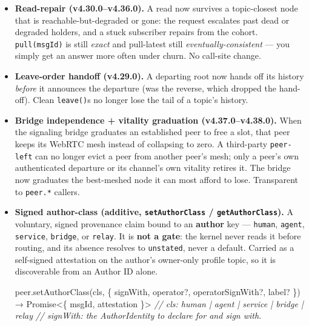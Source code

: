 \documentclass[
  nobib]{tufte-handout}
\newenvironment{Shaded}{}{}
\newcommand{\BuiltInTok}[1]{\textcolor[rgb]{0.00,0.50,0.00}{#1}}
\newcommand{\CommentTok}[1]{\textcolor[rgb]{0.38,0.63,0.69}{\textit{#1}}}
\newcommand{\FunctionTok}[1]{\textcolor[rgb]{0.02,0.16,0.49}{#1}}
\newcommand{\NormalTok}[1]{#1}
\newcommand{\OperatorTok}[1]{\textcolor[rgb]{0.40,0.40,0.40}{#1}}
\begin{document}
\begin{itemize}
\item
  \textbf{Read-repair (v4.30.0--v4.36.0).} A read now survives a
  topic-closest node that is reachable-but-degraded or gone: the request
  escalates past dead or degraded holders, and a stuck subscriber
  repairs from the cohort. \texttt{pull(msgId)} is still \emph{exact}
  and pull-latest still \emph{eventually-consistent} --- you simply get
  an answer more often under churn. No call-site change.
\item
  \textbf{Leave-order handoff (v4.29.0).} A departing root now hands off
  its history \emph{before} it announces the departure (was the reverse,
  which dropped the hand-off). Clean \texttt{leave()}s no longer lose
  the tail of a topic's history.
\item
  \textbf{Bridge independence + vitality graduation (v4.37.0--v4.38.0).}
  When the signaling bridge graduates an established peer to free a
  slot, that peer keeps its WebRTC mesh instead of collapsing to zero. A
  third-party \texttt{peer-left} can no longer evict a peer from another
  peer's mesh; only a peer's own authenticated departure or its
  channel's own vitality retires it. The bridge now graduates the
  best-meshed node it can most afford to lose. Transparent to
  \texttt{peer.*} callers.
\item
  \textbf{Signed author-class (additive, \texttt{setAuthorClass} /
  \texttt{getAuthorClass}).} A voluntary, signed provenance claim bound
  to an \textbf{author} key ---
  \texttt{\textquotesingle{}human\textquotesingle{}},
  \texttt{\textquotesingle{}agent\textquotesingle{}},
  \texttt{\textquotesingle{}service\textquotesingle{}},
  \texttt{\textquotesingle{}bridge\textquotesingle{}}, or
  \texttt{\textquotesingle{}relay\textquotesingle{}}. It is \textbf{not
  a gate}: the kernel never reads it before routing, and its absence
  resolves to \texttt{\textquotesingle{}unstated\textquotesingle{}},
  never a default. Carried as a self-signed attestation on the author's
  owner-only profile topic, so it is discoverable from an Author ID
  alone.

\begin{Shaded}
\begin{Highlighting}[]
\NormalTok{peer}\OperatorTok{.}\FunctionTok{setAuthorClass}\NormalTok{(cls}\OperatorTok{,}\NormalTok{ \{ signWith}\OperatorTok{,}\NormalTok{ operator}\OperatorTok{?,}\NormalTok{ operatorSignWith}\OperatorTok{?,}\NormalTok{ label}\OperatorTok{?}\NormalTok{ \})}
\NormalTok{  → }\BuiltInTok{Promise}\OperatorTok{\textless{}}\NormalTok{\{ msgId}\OperatorTok{,}\NormalTok{ attestation \}}\OperatorTok{\textgreater{}}
\CommentTok{//   cls: \textquotesingle{}human\textquotesingle{} | \textquotesingle{}agent\textquotesingle{} | \textquotesingle{}service\textquotesingle{} | \textquotesingle{}bridge\textquotesingle{} | \textquotesingle{}relay\textquotesingle{}}
\CommentTok{//   signWith: the AuthorIdentity to declare for and sign with.}


\end{Highlighting}
\end{Shaded}
\end{itemize}
\end{document}
